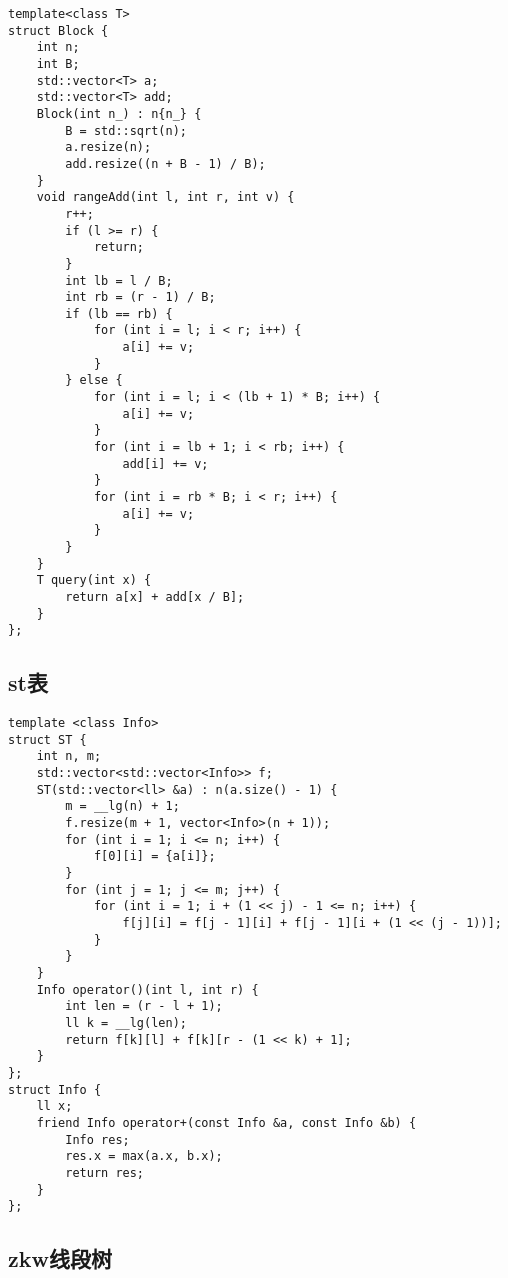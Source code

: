 \documentclass[a4paper,10pt]{article}
\begin{document}
\noindent\begin{lstlisting}
template<class T>
struct Block {
    int n;
    int B;
    std::vector<T> a;
    std::vector<T> add;
    Block(int n_) : n{n_} {
        B = std::sqrt(n);
        a.resize(n);
        add.resize((n + B - 1) / B);
    }
    void rangeAdd(int l, int r, int v) {
        r++;
        if (l >= r) {
            return;
        }
        int lb = l / B;
        int rb = (r - 1) / B;
        if (lb == rb) {
            for (int i = l; i < r; i++) {
                a[i] += v;
            }
        } else {
            for (int i = l; i < (lb + 1) * B; i++) {
                a[i] += v;
            }
            for (int i = lb + 1; i < rb; i++) {
                add[i] += v;
            }
            for (int i = rb * B; i < r; i++) {
                a[i] += v;
            }
        }
    }
    T query(int x) {
        return a[x] + add[x / B];
    }
};\end{lstlisting}

\subsection{st表}
\thispagestyle{fancy}

\noindent\begin{lstlisting}
template <class Info>
struct ST {
    int n, m;
    std::vector<std::vector<Info>> f;
    ST(std::vector<ll> &a) : n(a.size() - 1) {
        m = __lg(n) + 1;
        f.resize(m + 1, vector<Info>(n + 1));
        for (int i = 1; i <= n; i++) {
            f[0][i] = {a[i]};
        }
        for (int j = 1; j <= m; j++) {
            for (int i = 1; i + (1 << j) - 1 <= n; i++) {
                f[j][i] = f[j - 1][i] + f[j - 1][i + (1 << (j - 1))];
            }
        }
    }
    Info operator()(int l, int r) {
        int len = (r - l + 1);
        ll k = __lg(len);
        return f[k][l] + f[k][r - (1 << k) + 1];
    }
};
struct Info {
    ll x;
    friend Info operator+(const Info &a, const Info &b) {
        Info res;
        res.x = max(a.x, b.x);
        return res;
    }
};\end{lstlisting}

\subsection{zkw线段树}
\thispagestyle{fancy}
\end{document}
